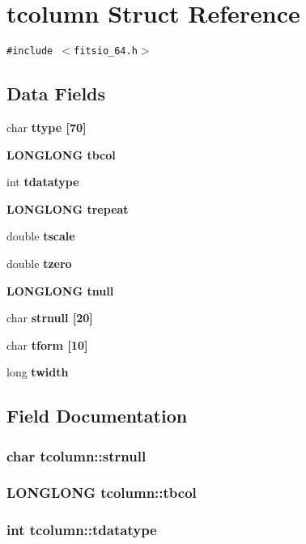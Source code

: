 \section{tcolumn Struct Reference}
\label{structtcolumn}
{\tt \#include $<$fitsio\_\-64.h$>$}

\subsection*{Data Fields}
\begin{CompactItemize}
\item 
char \bf{ttype} [70]
\item 
\bf{LONGLONG} \bf{tbcol}
\item 
int \bf{tdatatype}
\item 
\bf{LONGLONG} \bf{trepeat}
\item 
double \bf{tscale}
\item 
double \bf{tzero}
\item 
\bf{LONGLONG} \bf{tnull}
\item 
char \bf{strnull} [20]
\item 
char \bf{tform} [10]
\item 
long \bf{twidth}
\end{CompactItemize}


\subsection{Field Documentation}
\subsubsection{\setlength{\rightskip}{0pt plus 5cm}char \bf{tcolumn::strnull}}\label{structtcolumn_e045d30ff2a3199442c69c5f796a8f90}


\subsubsection{\setlength{\rightskip}{0pt plus 5cm}\bf{LONGLONG} \bf{tcolumn::tbcol}}\label{structtcolumn_91d09423f2adfe0270d77085ea065350}


\subsubsection{\setlength{\rightskip}{0pt plus 5cm}int \bf{tcolumn::tdatatype}}\label{structtcolumn_f3abf7e51680994983701dc142182c4d}


